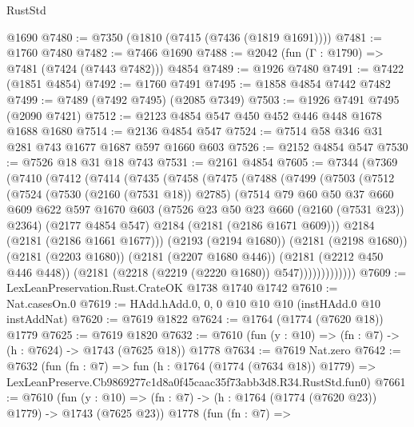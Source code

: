 \begin{lexlean}{RustStd}
\begin{coremodule}
    @1690
@7480 := @7350 (@1810 (@7415 (@7436 (@1819 @1691))))
@7481 := @1760 @7480
@7482 := @7466 @1690
@7488 := @2042 (fun (Γ : @1790) => @7481 (@7424 (@7443 @7482))) @4854
@7489 := @1926 @7480
@7491 := @7422 (@1851 @4854)
@7492 := @1760 @7491
@7495 := @1858 @4854 @7442 @7482
@7499 := @7489 (@7492 @7495) (@2085 @7349)
@7503 := @1926 @7491 @7495 (@2090 @7421)
@7512 := @2123 @4854 @547 @450 @452 @446 @448 @1678 @1688 @1680
@7514 := @2136 @4854 @547
@7524 := @7514 @58 @346 @31 @281 @743 @1677 @1687 @597 @1660 @603
@7526 := @2152 @4854 @547
@7530 := @7526 @18 @31 @18 @743
@7531 := @2161 @4854
@7605 := @7344
    (@7369
      (@7410
        (@7412
          (@7414
            (@7435
              (@7458
                (@7475
                  (@7488
                    (@7499
                      (@7503
                        (@7512
                          (@7524
                            (@7530 (@2160 (@7531 @18)) @2785)
                            (@7514
                              @79
                              @60
                              @50
                              @37
                              @660
                              @609
                              @622
                              @597
                              @1670
                              @603
                              (@7526 @23 @50 @23 @660 (@2160 (@7531 @23)) @2364)
                              (@2177 @4854 @547)
                              @2184
                              (@2181 (@2186 @1671 @609)))
                            @2184
                            (@2181 (@2186 @1661 @1677)))
                          (@2193 (@2194 @1680))
                          (@2181 (@2198 @1680))
                          (@2181 (@2203 @1680))
                          (@2181 (@2207 @1680 @446))
                          (@2181 (@2212 @450 @446 @448))
                          (@2181 (@2218 (@2219 (@2220 @1680)) @547)))))))))))))
@7609 := LexLeanPreservation.Rust.CrateOK @1738 @1740 @1742
@7610 := Nat.casesOn.{0}
@7619 := HAdd.hAdd.{0, 0, 0} @10 @10 @10 (instHAdd.{0} @10 instAddNat)
@7620 := @7619 @1822
@7624 := @1764 (@1774 (@7620 @18)) @1779
@7625 := @7619 @1820
@7632 := @7610 (fun (y : @10) => (fn : @7) -> (h : @7624) -> @1743 (@7625 @18)) @1778
@7634 := @7619 Nat.zero
@7642 := @7632
    (fun (fn : @7) =>
    fun (h : @1764 (@1774 (@7634 @18)) @1779) =>
    LexLeanPreserve.Cb9869277c1d8a0f45caac35f73abb3d8.R34.RustStd.fun0)
@7661 := @7610
    (fun (y : @10) => (fn : @7) -> (h : @1764 (@1774 (@7620 @23)) @1779) -> @1743 (@7625 @23))
    @1778
    (fun (fn : @7) =>

\end{coremodule}
\end{lexlean}
